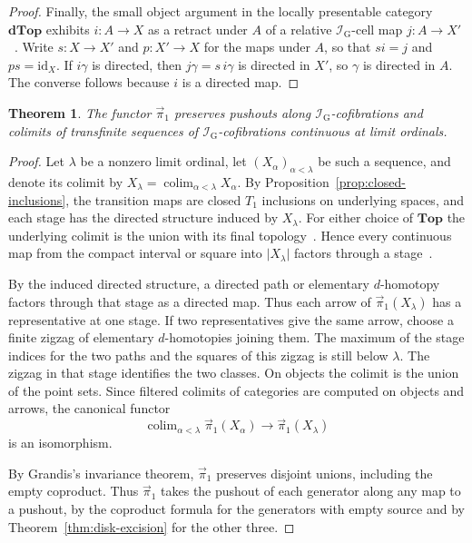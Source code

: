 \documentclass[12pt,a4paper]{amsart}
\newtheorem{theorem}{Theorem}[section]
\theoremstyle{definition}
\renewcommand{\vec}{\overrightarrow}
\newcommand{\D}{\mathbf{dTop}}
\newcommand{\I}{\mathcal I_{\mathrm G}}
\newcommand{\abs}[1]{\lvert#1\rvert}
\newcommand{\PiC}{\vec{\pi}_1}
\begin{document}
\begin{proof}
Finally, the small object argument in the locally presentable category $\D$ exhibits $i\colon A\to X$ as a retract under $A$ of a relative $\I$-cell map $j\colon A\to X'$~\cite[Corollary~2.1.15]{MR99h:55031}. Write $s\colon X\to X'$ and $p\colon X'\to X$ for the maps under $A$, so that $si=j$ and $ps=\mathrm{id}_X$. If $i\gamma$ is directed, then $j\gamma=s\,i\gamma$ is directed in $X'$, so $\gamma$ is directed in $A$. The converse follows because $i$ is a directed map.
\end{proof}

\begin{theorem}\label{thm:excision}
The functor $\PiC$ preserves pushouts along $\I$-cofibrations and colimits of transfinite sequences of $\I$-cofibrations continuous at limit ordinals.
\end{theorem}
\begin{proof}
Let $\lambda$ be a nonzero limit ordinal, let $(X_\alpha)_{\alpha<\lambda}$ be such a sequence, and denote its colimit by $X_\lambda=\operatorname{colim}_{\alpha<\lambda}X_\alpha$. By Proposition~\ref{prop:closed-inclusions}, the transition maps are closed $T_1$ inclusions on underlying spaces, and each stage has the directed structure induced by $X_\lambda$. For either choice of $\mathbf{Top}$ the underlying colimit is the union with its final topology~\cite[Proposition~B.16]{leftproperflow}. Hence every continuous map from the compact interval or square into $\abs{X_\lambda}$ factors through a stage~\cite[Proposition~2.4.2]{MR99h:55031}.

By the induced directed structure, a directed path or elementary $d$-homotopy factors through that stage as a directed map. Thus each arrow of $\PiC(X_\lambda)$ has a representative at one stage. If two representatives give the same arrow, choose a finite zigzag of elementary $d$-homotopies joining them. The maximum of the stage indices for the two paths and the squares of this zigzag is still below $\lambda$. The zigzag in that stage identifies the two classes. On objects the colimit is the union of the point sets. Since filtered colimits of categories are computed on objects and arrows, the canonical functor
\[
 \operatorname{colim}_{\alpha<\lambda}\PiC(X_\alpha)\longrightarrow\PiC(X_\lambda)
\]
is an isomorphism.

By Grandis's invariance theorem, $\PiC$ preserves disjoint unions, including the empty coproduct. Thus $\PiC$ takes the pushout of each generator along any map to a pushout, by the coproduct formula for the generators with empty source and by Theorem~\ref{thm:disk-excision} for the other three.


\end{proof}
\end{document}
